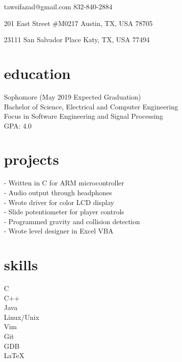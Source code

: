 \documentclass{cv_class}
\begin{document}
\leftskip 8pc
%
\begin{flushright}%

\vspace{6pt}
\contact
    {tawsifazad@gmail.com}%
    {832-840-2884}%

\address
    {Present}%
    {201 East  Street \#M0217}%
    {Austin, TX, USA}%
    {78705}%

\address
    {Permanent}%
    {23111 San Salvador Place}%
    {Katy, TX, USA}%
    {77494}%
\end{flushright}%

\section{education}%
Sophomore (May 2019 Expected Graduation) \\
Bachelor of Science, Electrical and Computer Engineering \\
Focus in Software Engineering and Signal Processing \\
GPA: 4.0 \\
\section{projects}%
- Written in C for ARM microcontroller \\
- Audio output through headphones \\
- Wrote driver for color LCD display \\
- Slide potentiometer for player controls \\
- Programmed gravity and collision detection \\
- Wrote level designer in Excel VBA \\
\section{skills}%
%
C\\
C++\\
\vspace{1em}
Java\\
%
Linux/Unix\\
Vim\\
Git\\
GDB\\
\LaTeX\\
\hfill
\end{document}
